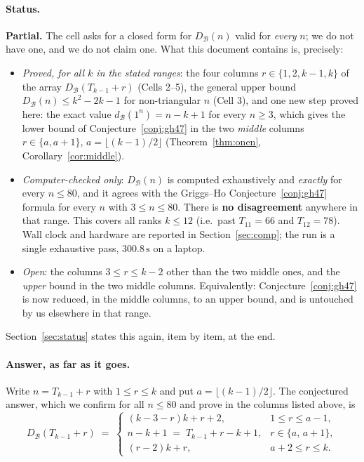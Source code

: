 \documentclass[11pt]{article}
\theoremstyle{definition}
\newcommand{\dB}{d_{\mathcal{B}}}
\newcommand{\DB}{D_{\mathcal{B}}}
\renewcommand{\le}{\leqslant}
\renewcommand{\ge}{\geqslant}
\newcommand{\NMAX}{80}
\newcommand{\KMAX}{12}
\newcommand{\TOTALSEC}{300.8\,\mathrm{s}}
\begin{document}
\paragraph{Status.}
\textbf{Partial.}  The cell asks for a closed form for $\DB(n)$ valid for \emph{every} $n$; we do not have one, and
we do not claim one.  What this document contains is, precisely:
\begin{itemize}
\item[(a)] \emph{Proved, for all $k$ in the stated ranges}: the four columns $r\in\{1,2,k-1,k\}$ of the array
$\DB(T_{k-1}+r)$ (Cells 2--5), the general upper bound $\DB(n)\le k^2-2k-1$ for non-triangular $n$ (Cell 3), and one
new step proved here: the exact value $\dB(1^n)=n-k+1$ for every $n\ge3$, which gives the lower bound of
Conjecture~\ref{conj:gh47} in the two \emph{middle} columns $r\in\{a,a+1\}$, $a=\lfloor (k-1)/2\rfloor$
(Theorem~\ref{thm:onen}, Corollary~\ref{cor:middle}).
\item[(b)] \emph{Computer-checked only}: $\DB(n)$ is computed exhaustively and \emph{exactly} for every
$n\le \NMAX$, and it agrees with the Griggs--Ho Conjecture~\ref{conj:gh47} formula for every $n$ with
$3\le n\le \NMAX$.  There is \textbf{no disagreement} anywhere in that range.  This covers all ranks $k\le \KMAX$
(i.e.\ past $T_{11}=66$ and $T_{12}=78$).  Wall clock and hardware are reported in
Section~\ref{sec:comp}; the run is a single exhaustive pass, $\TOTALSEC$ on a laptop.
\item[(c)] \emph{Open}: the columns $3\le r\le k-2$ other than the two middle ones, and the \emph{upper} bound in
the two middle columns.  Equivalently: Conjecture~\ref{conj:gh47} is now reduced, in the middle columns, to an
upper bound, and is untouched by us elsewhere in that range.
\end{itemize}
Section~\ref{sec:status} states this again, item by item, at the end.

\paragraph{Answer, as far as it goes.}
Write $n=T_{k-1}+r$ with $1\le r\le k$ and put $a=\lfloor(k-1)/2\rfloor$.  The conjectured answer, which we confirm
for all $n\le\NMAX$ and prove in the columns listed above, is
\[
\DB(T_{k-1}+r)\;=\;
\begin{cases}
(k-3-r)k+r+2, & 1\le r\le a-1,\\[2pt]
n-k+1\;=\;T_{k-1}+r-k+1, & r\in\{a,\,a+1\},\\[2pt]
(r-2)k+r, & a+2\le r\le k.
\end{cases}
\]
\end{document}
